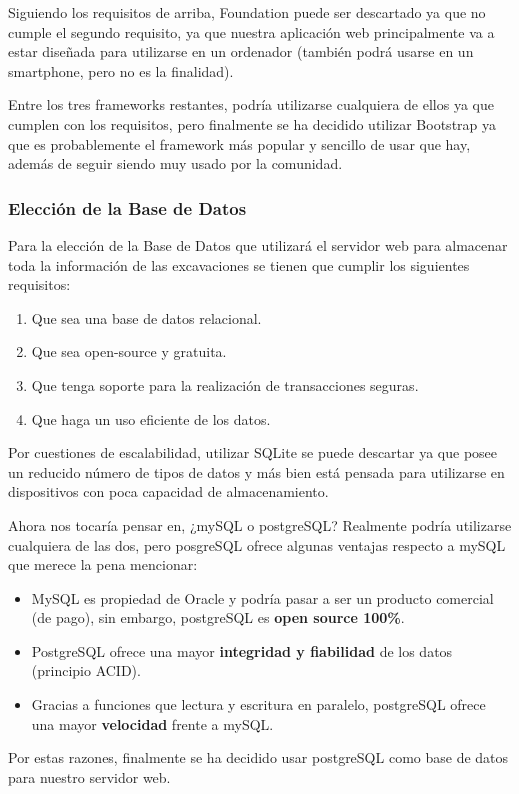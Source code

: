     Siguiendo los requisitos de arriba, Foundation puede ser descartado ya que no cumple el
    segundo requisito, ya que nuestra aplicación web principalmente va a estar diseñada para
    utilizarse en un ordenador (también podrá usarse en un smartphone, pero no es la
    finalidad).

    Entre los tres frameworks restantes, podría utilizarse cualquiera de ellos ya que cumplen
    con los requisitos, pero finalmente se ha decidido utilizar Bootstrap ya que es
    probablemente el framework más popular y sencillo de usar que hay, además de seguir
    siendo muy usado por la comunidad. 
    

    \subsubsection{Elección de la Base de Datos}
    Para la elección de la Base de Datos que utilizará el servidor web para almacenar toda
    la información de las excavaciones se tienen que cumplir los siguientes requisitos:

        \begin{enumerate}
            \item Que sea una base de datos relacional.
            \item Que sea open-source y gratuita.
            \item Que tenga soporte para la realización de transacciones seguras.
            \item Que haga un uso eficiente de los datos.
        \end{enumerate}

    Por cuestiones de escalabilidad, utilizar SQLite se puede descartar ya que posee un
    reducido número de tipos de datos y más bien está pensada para utilizarse en dispositivos
    con poca capacidad de almacenamiento.

    Ahora nos tocaría pensar en, ¿mySQL o postgreSQL? Realmente podría utilizarse cualquiera
    de las dos, pero posgreSQL ofrece algunas ventajas respecto a mySQL que merece la pena
    mencionar: 
    
        \begin{itemize}
            \item MySQL es propiedad de Oracle y podría pasar a ser un producto comercial
            (de pago), sin embargo, postgreSQL es \textbf{open source 100\%}.
            \item PostgreSQL ofrece una mayor \textbf{integridad y fiabilidad} de los datos
            (principio ACID).
            \item Gracias a funciones que lectura y escritura en paralelo, postgreSQL ofrece
            una mayor \textbf{velocidad} frente a mySQL.
        \end{itemize}
    
    Por estas razones, finalmente se ha decidido usar postgreSQL como base de datos para
    nuestro servidor web.
